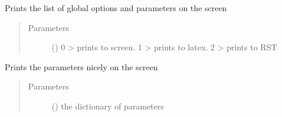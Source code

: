 \documentclass[letterpaper,10pt,english]{sphinxmanual}
\begin{document}

\begin{fulllineitems}
\label{\detokenize{functions:pyqcm.print_options}}
\sphinxAtStartPar
Prints the list of global options and parameters on the screen
\begin{quote}\begin{description}
\item[{Parameters}] \leavevmode
\sphinxAtStartPar
{} () \textendash{} 0 \sphinxhyphen{}\textgreater{} prints to screen. 1 \sphinxhyphen{}\textgreater{} prints to latex. 2 \sphinxhyphen{}\textgreater{} prints to RST

\end{description}\end{quote}

\end{fulllineitems}


\begin{fulllineitems}
\label{\detokenize{functions:pyqcm.print_parameters}}
\sphinxAtStartPar
Prints the parameters nicely on the screen
\begin{quote}\begin{description}
\item[{Parameters}] \leavevmode
\sphinxAtStartPar
{} () \textendash{} the dictionary of parameters

\end{description}\end{quote}

\end{fulllineitems}

\end{document}
